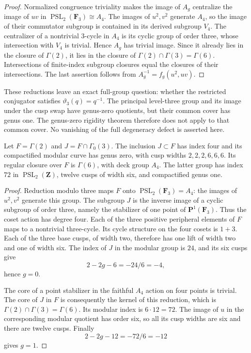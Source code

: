 \begin{proof}
Normalized congruence triviality makes the image of \(A_g\)
centralize the image of \(uv\) in
\(\operatorname{PSL}_2(\mathbf F_3)\cong A_4\).
The images of \(u^2,v^2\) generate \(A_4\), so the image of
their commutator subgroup is contained in its derived subgroup
\(V_4\). The centralizer of a nontrivial \(3\)-cycle in
\(A_4\) is its cyclic group of order three, whose intersection
with \(V_4\) is trivial. Hence \(A_g\) has trivial image. Since it already lies in the closure
of \(\Gamma(2)\), it lies in the closure of
\(\Gamma(2)\cap\Gamma(3)=\Gamma(6)\).
Intersections of finite-index subgroup closures equal the closures of
their intersections.
The last assertion follows from
\(A_g^{-1}=f_g(u^2,uv)\).
\end{proof}

These reductions leave an exact full-group question:
whether the restricted conjugator satisfies
\(\vartheta_3(q)=q^{-1}\). The principal level-three group
and its image under the cusp swap have genus-zero quotients,
but their common cover has genus one. The genus-zero
rigidity theorem therefore does not apply to that common
cover. No vanishing of the full degeneracy defect is
asserted here.

\begin{lemma}\label{lem:level3-marked-regular-closure}
Let \(F=\Gamma(2)\) and \(J=F\cap\Gamma_0(3)\).
The inclusion \(J\subset F\) has index four and its
compactified modular curve has genus zero, with cusp
widths \(2,2,2,6,6,6\).
Its regular closure over \(F\) is \(\Gamma(6)\), with
deck group \(A_4\). The latter group has index \(72\) in
\(\operatorname{PSL}_2(\mathbf Z)\), twelve cusps of width
six, and compactified genus one.
\end{lemma}
\begin{proof}
Reduction modulo three maps \(F\) onto
\(\operatorname{PSL}_2(\mathbf F_3)=A_4\): the images of
\(u^2,v^2\) generate this group. The subgroup \(J\) is the
inverse image of a cyclic subgroup of order three, namely
the stabilizer of one point of \(\mathbf P^1(\mathbf F_3)\).
Thus the coset action has degree four. Each of the three
positive peripheral elements of \(F\) maps to a nontrivial
three-cycle. Its cycle structure on the four cosets is
\(1+3\). Each of the three base cusps, of width two,
therefore has one lift of width two and one of width six.
The index of \(J\) in the modular group is \(24\), and its
six cusps give
\[
 2-2g-6=-24/6=-4,
\]
hence \(g=0\).

The core of a point stabilizer in the faithful \(A_4\)
action on four points is trivial. The core of \(J\) in
\(F\) is consequently the kernel of this reduction, which
is \(\Gamma(2)\cap\Gamma(3)=\Gamma(6)\).
Its modular index is \(6\cdot12=72\). The image of \(u\)
in the corresponding modular quotient has order six,
so all its cusp widths are six and there are twelve cusps.
Finally
\[
 2-2g-12=-72/6=-12
\]
gives \(g=1\).
\end{proof}

